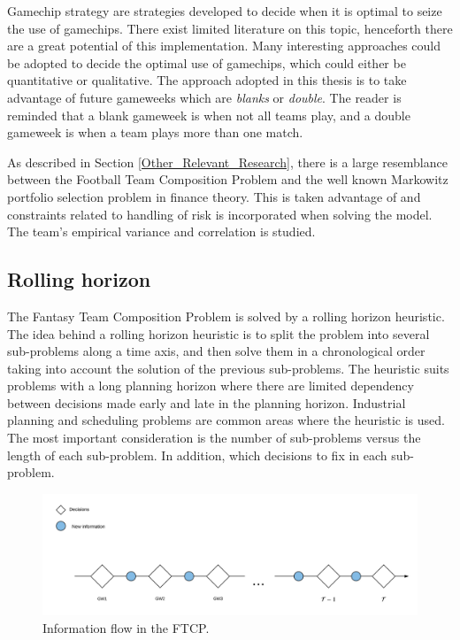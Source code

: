 \newpar

Gamechip strategy are strategies developed to decide when it is optimal to seize the use of gamechips.  There exist limited literature on this topic, henceforth there are a great potential of this implementation. Many interesting approaches could be adopted to decide the optimal use of gamechips, which could either be quantitative or qualitative. The approach adopted in this thesis is to take advantage of future gameweeks which are \textit{blanks} or \textit{double}. The reader is reminded that a blank gameweek is when not all teams play, and a double gameweek is when a team plays more than one match. 

\newpar

As described in Section \ref{Other_Relevant_Research}, there is a large resemblance between the Football Team Composition Problem and the well known Markowitz portfolio selection problem in finance theory. This is taken advantage of and constraints related to handling of risk is incorporated when solving the model. The team's empirical variance and correlation is studied. 


\subsection{Rolling horizon}

The Fantasy Team Composition Problem is solved by a rolling horizon heuristic. The idea behind a rolling horizon heuristic is to split the problem into several sub-problems along a time axis, and then solve them in a chronological order taking into account the solution of the previous sub-problems. The heuristic suits problems with a long planning horizon where there are limited dependency between decisions made early and late in the planning horizon. Industrial planning and scheduling problems are common areas where the heuristic is used. The most important consideration is the number of sub-problems versus the length of each sub-problem. In addition, which decisions to fix in each sub-problem. 

\begin{figure}[H]
    \centering
    \includegraphics[scale = 0.47]{fig/chapter_5/Rolling_Horizon_Information_Flow.png}
    \caption{Information flow in the FTCP.}
    \label{fig:solution}
\end{figure}

